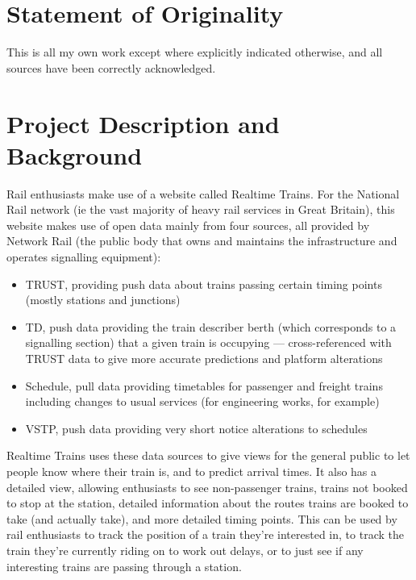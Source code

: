 \documentclass[a4paper,12pt]{article}
\begin{document}
\tableofcontents

\pagebreak

\section*{Statement of Originality}

This is all my own work except where explicitly indicated otherwise, and all
sources have been correctly acknowledged.

\pagebreak

\section{Project Description and Background}

Rail enthusiasts make use of a website called Realtime Trains. For the National
Rail network (ie the vast majority of heavy rail services in Great Britain),
this website makes use of open data mainly from four sources, all provided by
Network Rail (the public body that owns and maintains the infrastructure and
operates signalling equipment)\cite{RTTData}:

\begin{itemize}
  \item TRUST, providing push data about trains passing certain timing points
    (mostly stations and junctions)
  \item TD, push data providing the train describer berth (which corresponds to
    a signalling section) that a given train is occupying --- cross-referenced
    with TRUST data to give more accurate predictions and platform alterations
  \item Schedule, pull data providing timetables for passenger and freight
    trains including changes to usual services (for engineering works, for
    example)
  \item VSTP, push data providing very short notice alterations to schedules
\end{itemize}

Realtime Trains uses these data sources to give views for the general public to
let people know where their train is, and to predict arrival times. It also has
a detailed view, allowing enthusiasts to see non-passenger trains, trains not
booked to stop at the station, detailed information about the routes trains are
booked to take (and actually take), and more detailed timing points. This can
be used by rail enthusiasts to track the position of a train they're interested
in, to track the train they're currently riding on to work out delays, or to
just see if any interesting trains are passing through a station.
\end{document}
